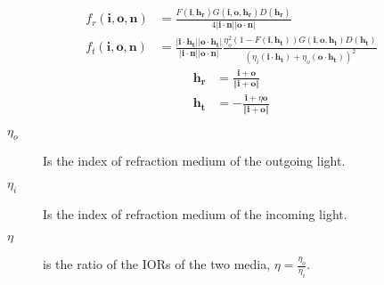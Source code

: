\documentclass[10pt]{armath}
\newcommand{\lp}{\left(}
\newcommand{\rp}{\right)}
\newcommand{\lv}{\left|}
\newcommand{\rv}{\right|}
\newcommand{\lvv}{\left\Vert}
\newcommand{\rvv}{\right\Vert}
\renewcommand{\b}[1]{\mathbf{#1}}
\begin{document}
\begin{align*}
  f_r\lp\b{i},\b{o},\b{n}\rp&=\frac{F\lp\b{i},\b{h_r}\rp
    G\lp\b{i},\b{o},\b{h_r}\rp
    D\lp\b{h_r}\rp}{4\lv\b{i}\cdot\b{n}\rv\lv\b{o}\cdot\b{n}\rv}\\
  f_t\lp\b{i},\b{o},\b{n}\rp&=\frac{\lv\b{i}\cdot\b{h_t}\rv\lv\b{o}\cdot\b{h_t}\rv}{\lv\b{i}\cdot\b{n}\rv\lv\b{o}\cdot\b{n}\rv}
  \frac{\eta_o^2\lp1-F\lp\b{i},\b{h_t}\rp\rp G\lp\b{i},\b{o},\b{h_t}\rp
    D\lp\b{h_t}\rp}{{\lp\eta_i\lp\b{i}\cdot\b{h_t}\rp+\eta_o\lp\b{o}\cdot\b{h_t}\rp\rp}^2}
\end{align*}
\begin{align*}
  \b{h_r}&=\frac{\b{i}+\b{o}}{\lvv\b{i}+\b{o}\rvv}\\
  \b{h_t}&=-\frac{\b{i}+\eta\b{o}}{\lvv\b{i}+\b{o}\rvv}
\end{align*}
\begin{description}
  \item[$\eta_o$] Is the index of refraction medium of the outgoing light.
  \item[$\eta_i$] Is the index of refraction medium of the incoming light.
  \item[$\eta$] is the ratio of the IORs of the two media,
    $\eta=\frac{\eta_o}{\eta_i}$. 
\end{description}
\end{document}

